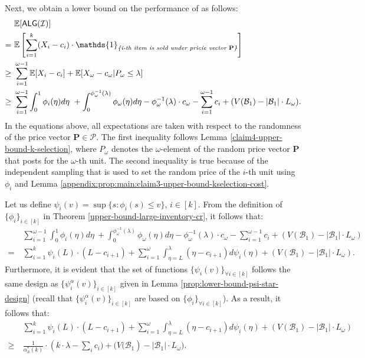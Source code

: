 Next, we obtain a lower bound on the performance of \rDynamic as follows:
\begin{align*}
    & \mathbb{E}[\ALG(\mathcal{I})] \\
    =\ & \mathbb{E}\left[\sum_{i=1}^{k} (X_{i} - c_{i}) \cdot \mathds{1}_{\textit{\{i-th item is sold under pricie vector $\mathbf{P}$\}}}\right]\\
    \geq\ &  \sum_{i=1}^{\omega-1} \mathbb{E}[X_{i} - c_{i}] +    \mathbb{E}[X_{\omega} - c_{\omega} | P_{\omega} \leq \lambda]\\
    \ge\ &  \sum_{i=1}^{\omega-1} \int_{0}^{1} \phi_i(\eta) d\eta \ + \int_{0}^{\phi_{\omega}^{-1}(\lambda)} \phi_{\omega}(\eta) d\eta - \phi_{\omega}^{-1}(\lambda) \cdot c_{\omega} - \sum_{i=1}^{\omega-1} c_{i}  + (V(\mathcal{B}_{1}) - |\mathcal{B}_{1}| \cdot L_{\omega}).
\end{align*}
In the equations above, all expectations are taken with respect to the randomness of the price vector $\mathbf{P} \in \mathcal{P}$.  The first inequality follows Lemma \ref{claim4-upper-bound-k-selection}, where $P_{\omega}$ denotes the  $\omega$-element of the random price vector $\mathbf{P}$ that \rDynamic posts for the $\omega$-th unit.
The second inequality is true because of the independent sampling that is used to set the random price of the $i$-th unit using $\phi_{i}$ and Lemma \ref{appendix:prop:main:claim3-upper-bound-kselection-cost}.  

Let us define $\psi_{i}(v) = \sup\{s : \phi_{i}(s) \leq v\}$, $i \in [k]$. From the definition of $\{\phi_{i}\}_{i \in [k]}$ in Theorem \ref{upper-bound-large-inventory-cr}, it follows that:
\begin{align*}
 &\sum_{i=1}^{\omega-1} \int_{0}^{1} \phi_i(\eta) d\eta \ + \int_{0}^{\phi_{\omega}^{-1}(\lambda)} \phi_{\omega}(\eta) d\eta - \phi_{\omega}^{-1}(\lambda) \cdot c_{\omega}  - \sum_{i=1}^{\omega-1} c_{i} + (V(\mathcal{B}_{1}) - |\mathcal{B}_{1}| \cdot L_{\omega}) \\
 =\ & \sum_{i=1}^{k} \psi_{i}(L) \cdot (L - c_{i+1}) + \sum_{i=1}^{\omega} \int_{\eta =L}^{\lambda} (\eta - c_{i+1} )d\psi_{i}(\eta)  + (V(\mathcal{B}_{1}) - |\mathcal{B}_{1}| \cdot L_{\omega}).
\end{align*}
Furthermore, it is evident that the set of functions $\{\psi_{i}(v)\}_{\forall i \in [k]}$ follows the same design as $\{\psi_{i}^{\alpha}(v)\}_{i \in [k]}$ given in Lemma \ref{prop:lower-bound-psi-star-design} (recall that $\{\psi_{i}^{\alpha}(v)\}_{i \in [k]}$ are based on $\{\phi_{i}\}_{\forall i \in [k]}$). As a result, it follows that:\begin{align*}
    &\sum_{i=1}^{k} \psi_{i}(L) \cdot (L - c_{i+1}) + \sum_{i=1}^{\omega} \int_{\eta =L}^{\lambda} (\eta - c_{i+1} )d\psi_{i}(\eta)   + (V(\mathcal{B}_{1}) - |\mathcal{B}_{1}| \cdot L_{\omega})\\
   \ge\ &  \frac{1}{\alpha_{\mathcal{S}}^*(k)} \cdot \left(k \cdot \lambda - \sum_{i} c_{i}) + (V(\mathcal{B}_{1} \right) - |\mathcal{B}_{1}| \cdot L_{\omega}).
\end{align*}


